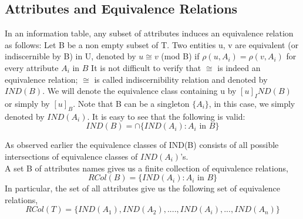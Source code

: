 \documentclass[12pt]{article}
\begin{document}
\subsection{Attributes and Equivalence Relations}
In an information table, any subset of attributes induces an equivalence relation as follows: Let B be a non empty subset of T. Two entities u, v are equivalent (or indiscernible by B) in U, denoted by
\vskip 10pt
$u \cong v$ (mod B) if $\rho(u, A_i) = \rho(v, A_i)$ for every attribute $A_i \mbox{ in } B$
\vskip 10pt
It is not difficult to verify that $\cong$ is indeed an equivalence relation; $\cong$ is called indiscernibility relation and denoted by $IND(B)$. We will denote the equivalence class containing u by	$[u]_IND(B)$ or simply by $[u]_B$. Note that B can be a singleton $\{A_i\}$, in this case, we simply denoted by $IND(A_i)$.  It is easy to see that the following is valid:
\[IND(B) = \cap \{IND(A_i): A_i \mbox{ in } B\}\]

As observed earlier the equivalence classes of  IND(B) consists of all possible intersections of equivalence classes of $IND(A_i)$'s.\\
A set B of attributes names gives us a finite collection of equivalence relations,
\[RCol(B) = \{IND(A_i): A_i \mbox{ in } B\}\]
In particular, the set of all attributes give us the following set of equivalence relations,
\[RCol(T) = \{IND(A_1),IND(A_2),....,IND(A_i),...,IND(A_n)\}\]
\end{document}
